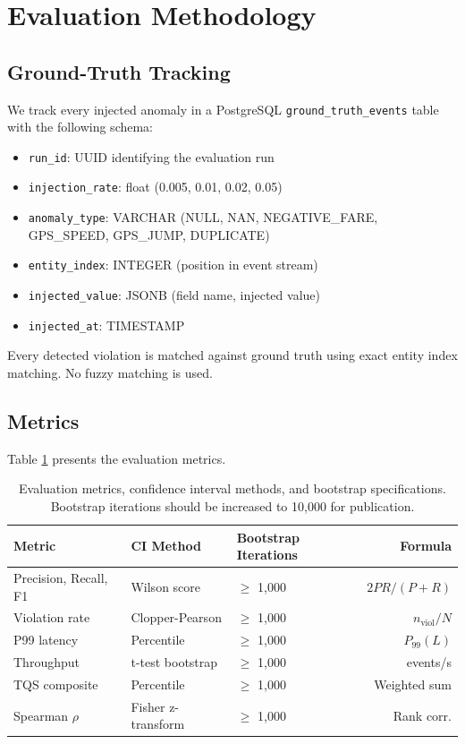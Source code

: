 \section{Evaluation Methodology}
\label{sec:evaluation-methodology}

\subsection{Ground-Truth Tracking}

We track every injected anomaly in a PostgreSQL \texttt{ground\_truth\_events}
table with the following schema:

\begin{itemize}
  \itemsep0em
  \item \texttt{run\_id}: UUID identifying the evaluation run
  \item \texttt{injection\_rate}: float (0.005, 0.01, 0.02, 0.05)
  \item \texttt{anomaly\_type}: VARCHAR (NULL, NAN, NEGATIVE\_FARE, GPS\_SPEED,
        GPS\_JUMP, DUPLICATE)
  \item \texttt{entity\_index}: INTEGER (position in event stream)
  \item \texttt{injected\_value}: JSONB (field name, injected value)
  \item \texttt{injected\_at}: TIMESTAMP
\end{itemize}

Every detected violation is matched against ground truth using exact
entity index matching. No fuzzy matching is used.

\subsection{Metrics}

Table \ref{tab:eval-metrics} presents the evaluation metrics.

\begin{table}[htbp]
  \centering
  \caption{Evaluation metrics, confidence interval methods, and bootstrap
    specifications. Bootstrap iterations should be increased to 10,000 for
    publication.}
  \label{tab:eval-metrics}
  \begin{tabular}{lllr}
    \toprule
    Metric & CI Method & Bootstrap Iterations & Formula \\
    \midrule
    Precision, Recall, F1 & Wilson score     & $\geq$ 1,000 & $2P\!R/(P+R)$ \\
    Violation rate        & Clopper-Pearson & $\geq$ 1,000 & $n_{\text{viol}}/N$ \\
    P99 latency           & Percentile       & $\geq$ 1,000 & $P_{99}(L)$ \\
    Throughput            & t-test bootstrap & $\geq$ 1,000 & events/s \\
    TQS composite         & Percentile       & $\geq$ 1,000 & Weighted sum \\
    Spearman $\rho$       & Fisher z-transform& $\geq$ 1,000 & Rank corr. \\
    \bottomrule
  \end{tabular}
\end{table}

